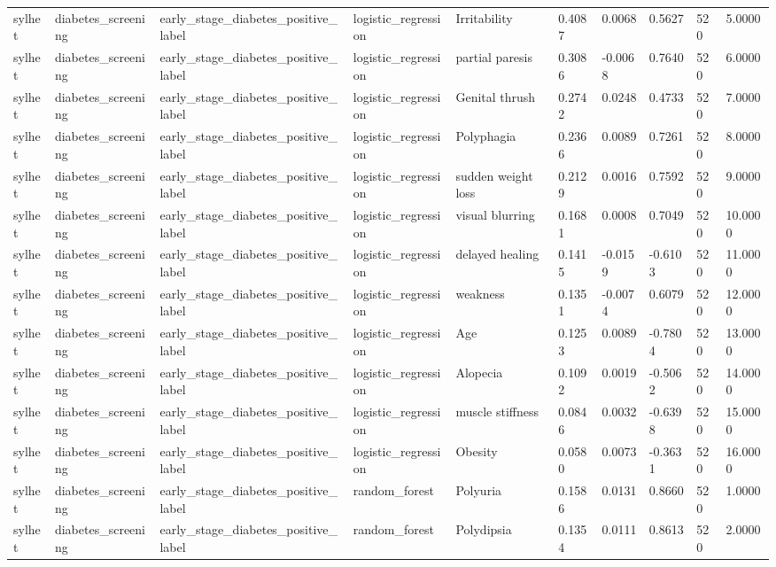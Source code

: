 \begin{tabular}{llllllllll}
sylhet & diabetes\_screening & early\_stage\_diabetes\_positive\_label & logistic\_regression & Irritability & 0.4087 & 0.0068 & 0.5627 & 520 & 5.0000 \\
sylhet & diabetes\_screening & early\_stage\_diabetes\_positive\_label & logistic\_regression & partial paresis & 0.3086 & -0.0068 & 0.7640 & 520 & 6.0000 \\
sylhet & diabetes\_screening & early\_stage\_diabetes\_positive\_label & logistic\_regression & Genital thrush & 0.2742 & 0.0248 & 0.4733 & 520 & 7.0000 \\
sylhet & diabetes\_screening & early\_stage\_diabetes\_positive\_label & logistic\_regression & Polyphagia & 0.2366 & 0.0089 & 0.7261 & 520 & 8.0000 \\
sylhet & diabetes\_screening & early\_stage\_diabetes\_positive\_label & logistic\_regression & sudden weight loss & 0.2129 & 0.0016 & 0.7592 & 520 & 9.0000 \\
sylhet & diabetes\_screening & early\_stage\_diabetes\_positive\_label & logistic\_regression & visual blurring & 0.1681 & 0.0008 & 0.7049 & 520 & 10.0000 \\
sylhet & diabetes\_screening & early\_stage\_diabetes\_positive\_label & logistic\_regression & delayed healing & 0.1415 & -0.0159 & -0.6103 & 520 & 11.0000 \\
sylhet & diabetes\_screening & early\_stage\_diabetes\_positive\_label & logistic\_regression & weakness & 0.1351 & -0.0074 & 0.6079 & 520 & 12.0000 \\
sylhet & diabetes\_screening & early\_stage\_diabetes\_positive\_label & logistic\_regression & Age & 0.1253 & 0.0089 & -0.7804 & 520 & 13.0000 \\
sylhet & diabetes\_screening & early\_stage\_diabetes\_positive\_label & logistic\_regression & Alopecia & 0.1092 & 0.0019 & -0.5062 & 520 & 14.0000 \\
sylhet & diabetes\_screening & early\_stage\_diabetes\_positive\_label & logistic\_regression & muscle stiffness & 0.0846 & 0.0032 & -0.6398 & 520 & 15.0000 \\
sylhet & diabetes\_screening & early\_stage\_diabetes\_positive\_label & logistic\_regression & Obesity & 0.0580 & 0.0073 & -0.3631 & 520 & 16.0000 \\
sylhet & diabetes\_screening & early\_stage\_diabetes\_positive\_label & random\_forest & Polyuria & 0.1586 & 0.0131 & 0.8660 & 520 & 1.0000 \\
sylhet & diabetes\_screening & early\_stage\_diabetes\_positive\_label & random\_forest & Polydipsia & 0.1354 & 0.0111 & 0.8613 & 520 & 2.0000 \\

\end{tabular}
